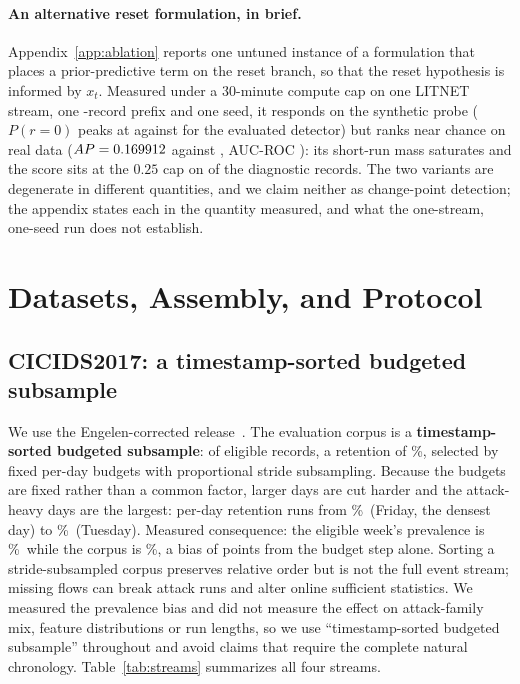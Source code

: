 \documentclass[manuscript,anonymous,review]{acmart}
\begin{document}
\paragraph{An alternative reset formulation, in brief.}
Appendix~\ref{app:ablation} reports one untuned instance of a formulation that
places a prior-predictive term on the reset branch, so that the reset
hypothesis is informed by $x_t$. Measured under a 30-minute compute cap on one
LITNET stream, one \SSixPrefixRows-record prefix and one seed, it responds on
the synthetic probe ($P(r{=}0)$ peaks at \SSixProbeCorrectedPeak{} against
\SSixProbeOriginalPeak{} for the evaluated detector) but ranks near chance on
real data ($AP=0.169912$ against \SSixOriginalAucpr, AUC-ROC
\SSixCorrectedAucroc): its short-run mass saturates and the score sits at the
$0.25$ cap on \SSixDiagCorrectedFracAtCap{} of the diagnostic records. The two
variants are degenerate in different quantities, and we claim neither as
change-point detection; the appendix states each in the quantity measured, and
what the one-stream, one-seed run does not establish.

\section{Datasets, Assembly, and Protocol}
\label{sec:streams}

\subsection{CICIDS2017: a timestamp-sorted budgeted subsample}
We use the Engelen-corrected release~\citep{engelen2021cicids}. The evaluation
corpus is a \textbf{timestamp-sorted budgeted subsample}: \CicidsWeekUsedRows{}
of \CicidsWeekEligibleRows{} eligible records, a retention of
\CicidsWeekRetentionPct\%, selected by fixed per-day budgets with proportional
stride subsampling. Because the budgets are fixed rather than a common factor,
larger days are cut harder and the attack-heavy days are the largest: per-day
retention runs from \CicidsWeekMinDayRetentionPct\%\ (Friday, the densest day)
to \CicidsWeekMaxDayRetentionPct\%\ (Tuesday). Measured consequence: the
eligible week's prevalence is \CicidsWeekTruePrevalencePct\%\ while the corpus
is \CicidsWeekUsedPrevalencePct\%, a bias of \CicidsWeekPrevalenceBiasPp{}
points from the budget step alone. Sorting a stride-subsampled corpus preserves
relative order but is not the full event stream; missing flows can break attack
runs and alter online sufficient statistics. We measured the prevalence bias
and did not measure the effect on attack-family mix, feature distributions or
run lengths, so we use ``timestamp-sorted budgeted subsample'' throughout and
avoid claims that require the complete natural chronology.
Table~\ref{tab:streams} summarizes all four streams.
\end{document}
